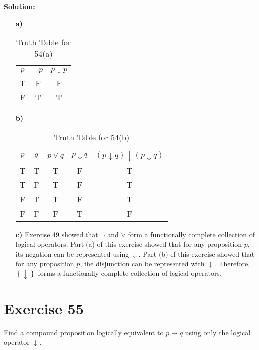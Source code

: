 \documentclass{Axon}
\begin{document}
\noindent
\textbf{Solution:}
\begin{enumerate}
    \item[\textbf{a)}]
    \begin{table}[ht]
    \centering
    \begin{tabular}{c|c|c}
        \(p\) & \(\lnot p\) & \(p \downarrow p\) \\
        T     & F           & F                  \\
        F     & T           & T
    \end{tabular}
    \caption{Truth Table for 54(a)}
    \end{table}

    \item[\textbf{b)}]
    \begin{table}[ht]
    \centering
    \begin{tabular}{c|c|c|c|c}
        \(p\) & \(q\) & \(p \lor q\) & \(p \downarrow q\) & \((p \downarrow q) \downarrow (p \downarrow q)\) \\
        T     & T     & T            & F                  & T                                                \\
        T     & F     & T            & F                  & T                                                \\
        F     & T     & T            & F                  & T                                                \\
        F     & F     & F            & T                  & F
    \end{tabular}
    \caption{Truth Table for 54(b)}
    \end{table}
    
    \item[\textbf{c)}]
    Exercise 49 showed that \(\lnot\) and \(\lor\) form a functionally complete collection of logical operators. Part (a) of this exercise showed that for any proposition \(p\), its negation can be represented using \(\downarrow\). Part (b) of this exercise showed that for any proposition \(p\), the disjunction can be represented with \(\downarrow\). Therefore, \(\left\{\downarrow\right\}\) forms a functionally complete collection of logical operators.
\end{enumerate}

\section*{Exercise 55}
Find a compound proposition logically equivalent to \(p \to q\) using only the logical operator \(\downarrow\).
\end{document}
